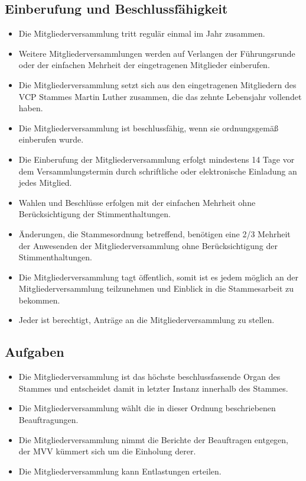 \documentclass[a4paper]{article}
\begin{document}
    \subsection{Einberufung und Beschlussfähigkeit} %
    \label{sub:einberufung_und_beschlussfahigkeit}
	\begin{itemize}
		\item Die Mitgliederversammlung tritt regulär einmal im Jahr zusammen.
		\item Weitere Mitgliederversammlungen werden auf Verlangen der Führungsrunde oder der einfachen Mehrheit der eingetragenen Mitglieder einberufen. 
		\item Die Mitgliederversammlung setzt sich aus den eingetragenen Mitgliedern des VCP Stammes Martin Luther zusammen, die das zehnte Lebensjahr vollendet haben. 
		\item Die Mitgliederversammlung ist beschlussfähig, wenn sie ordnungsgemäß einberufen wurde. 
		\item Die Einberufung der Mitgliederversammlung erfolgt mindestens 14 Tage vor dem Versammlungstermin durch schriftliche oder elektronische Einladung an jedes Mitglied. 
		\item Wahlen und Beschlüsse erfolgen mit der einfachen Mehrheit ohne Berücksichtigung der Stimmenthaltungen. 
		\item Änderungen, die Stammesordnung betreffend, benötigen eine 2/3 Mehrheit der Anwesenden der Mitgliederversammlung ohne Berücksichtigung der Stimmenthaltungen. 
		\item Die Mitgliederversammlung tagt öffentlich, somit ist es jedem möglich an der Mitgliederversammlung teilzunehmen und Einblick in die Stammesarbeit zu bekommen. 
		\item Jeder ist berechtigt, Anträge an die Mitgliederversammlung zu stellen. 
	\end{itemize}
    \subsection{Aufgaben} %
    \label{sub:aufgaben}
	\begin{itemize}
		\item Die Mitgliederversammlung ist das höchste beschlussfassende Organ des Stammes und entscheidet damit in letzter Instanz innerhalb des Stammes. 
		\item Die Mitgliederversammlung wählt die in dieser Ordnung beschriebenen Beauftragungen. 
		\item Die Mitgliederversammlung nimmt die Berichte der Beauftragen entgegen, der MVV kümmert sich um die Einholung derer. 
		\item Die Mitgliederversammlung kann Entlastungen erteilen. 
	\end{itemize}
\end{document}
